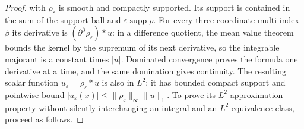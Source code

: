 \documentclass[11pt,a4paper]{article}
\theoremstyle{definition}
\theoremstyle{remark}
\begin{document}
\begin{proof}
with $\rho_\varepsilon$ is smooth and compactly supported. Its
support is contained in the sum of the support ball and
$\varepsilon\operatorname{supp}\rho$. For every three-coordinate multi-index
$\beta$ its derivative is
$(\partial^\beta\rho_\varepsilon)*u$:
in a difference quotient, the mean value theorem bounds the kernel
by the supremum of its next derivative, so the integrable majorant
is a constant times $|u|$. Dominated convergence proves the formula
one derivative at a time, and the same domination gives continuity.
The resulting scalar function $u_\varepsilon=\rho_\varepsilon*u$
is also in $L^2$: it has bounded compact support and pointwise bound
$|u_\varepsilon(x)|\leq\|\rho_\varepsilon\|_\infty\|u\|_1$.
To prove its $L^2$ approximation property without silently interchanging
an integral and an $L^2$ equivalence class, proceed as follows.


\end{proof}
\end{document}
